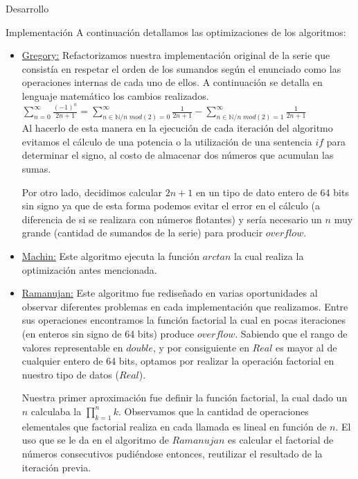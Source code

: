 \begin{section}{Desarrollo}
\begin{subsection}{Implementación}
	   A continuación detallamos las optimizaciones de los algoritmos:

		\begin{itemize}
			\item \underline{Gregory:} Refactorizamos nuestra implementación original de la serie que consistía en respetar el orden de los sumandos según el enunciado como las operaciones internas de cada uno de ellos. A continuación se detalla en lenguaje matemático los cambios realizados.\\
							
				$\sum_{n=0}^{\infty}\frac{(-1)^n}{2n+1} = \sum_{n \in \mathbb{N} / n\;mod(2)=0}^{\infty}\frac{1}{2n+1}-\sum_{n \in \mathbb{N} / n\;mod(2)=1}^{\infty}\frac{1}{2n+1}$\\
				
				Al hacerlo de esta manera en la ejecución de cada iteración del algoritmo evitamos el cálculo de una potencia o la utilización de una sentencia $if$ para determinar el signo, al costo de almacenar dos números que acumulan las sumas.
				
				Por otro lado, decidimos calcular $2n+1$ en un tipo de dato entero de 64 bits sin signo ya que de esta forma podemos evitar el error en el cálculo (a diferencia de si se realizara con números flotantes) y sería necesario un $n$ muy grande (cantidad de sumandos de la serie) para producir $overflow$.
				
			\item \underline{Machin:} Este algoritmo ejecuta la función $arctan$ la cual realiza la optimización antes mencionada.
			
			\item \underline{Ramanujan:} Este algoritmo fue rediseñado en varias oportunidades al observar diferentes problemas en cada implementación que realizamos. Entre sus operaciones encontramos la función factorial la cual en pocas iteraciones (en enteros sin signo de 64 bits) produce $overflow$. Sabiendo que el rango de valores representable en $double$, y por consiguiente en $Real$ es mayor al de cualquier entero de 64 bits, optamos por realizar la operación factorial en nuestro tipo de datos ($Real$).
			
		Nuestra primer aproximación fue definir la función factorial, la cual dado un $n$ calculaba la $\prod_{k=1}^{n}{k}$. Observamos que la cantidad de operaciones elementales que factorial realiza en cada llamada es lineal en función de $n$. El uso que se le da en el algoritmo de $Ramanujan$ es calcular el factorial de números consecutivos pudiéndose entonces, reutilizar el resultado de la iteración previa.\VSP
		

\end{itemize}
\end{subsection}
\end{section}
